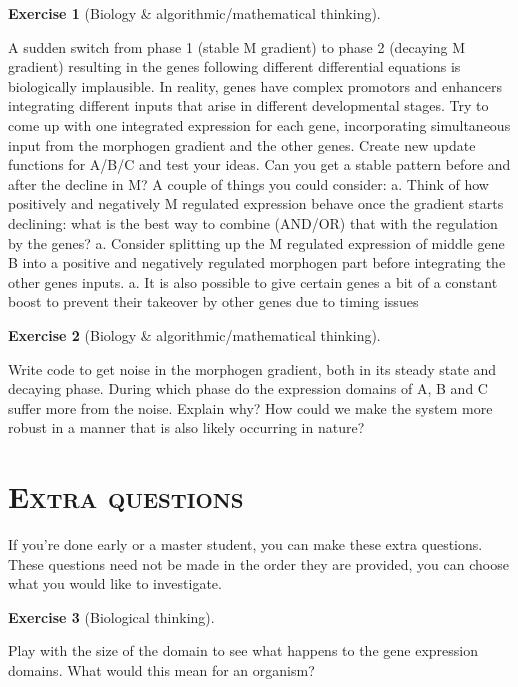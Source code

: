 \documentclass[
  letterpaper,
  DIV=11,
  numbers=noendperiod]{scrreprt}
\theoremstyle{definition}
\newtheorem{exercise}{Exercise}[chapter]
\theoremstyle{remark}
\begin{document}
\begin{exercise}[Biology \& algorithmic/mathematical
thinking]\protect\hypertarget{exr-plain}{}\label{exr-plain}

A sudden switch from phase 1 (stable M gradient) to phase 2 (decaying M
gradient) resulting in the genes following different differential
equations is biologically implausible. In reality, genes have complex
promotors and enhancers integrating different inputs that arise in
different developmental stages. Try to come up with one integrated
expression for each gene, incorporating simultaneous input from the
morphogen gradient and the other genes. Create new update functions for
A/B/C and test your ideas. Can you get a stable pattern before and after
the decline in M? A couple of things you could consider: a. Think of how
positively and negatively M regulated expression behave once the
gradient starts declining: what is the best way to combine (AND/OR) that
with the regulation by the genes? a. Consider splitting up the M
regulated expression of middle gene B into a positive and negatively
regulated morphogen part before integrating the other genes inputs. a.
It is also possible to give certain genes a bit of a constant boost to
prevent their takeover by other genes due to timing issues

\end{exercise}

\begin{exercise}[Biology \& algorithmic/mathematical
thinking]\protect\hypertarget{exr-plain}{}\label{exr-plain}

Write code to get noise in the morphogen gradient, both in its steady
state and decaying phase. During which phase do the expression domains
of A, B and C suffer more from the noise. Explain why? How could we make
the system more robust in a manner that is also likely occurring in
nature?

\end{exercise}

\section{\texorpdfstring{\textsc{\textbf{Extra
questions}}}{Extra questions}}\label{extra-questions}

If you're done early or a master student, you can make these extra
questions. These questions need not be made in the order they are
provided, you can choose what you would like to investigate.

\begin{exercise}[Biological
thinking]\protect\hypertarget{exr-plain}{}\label{exr-plain}

Play with the size of the domain to see what happens to the gene
expression domains. What would this mean for an organism?

\end{exercise}
\end{document}
